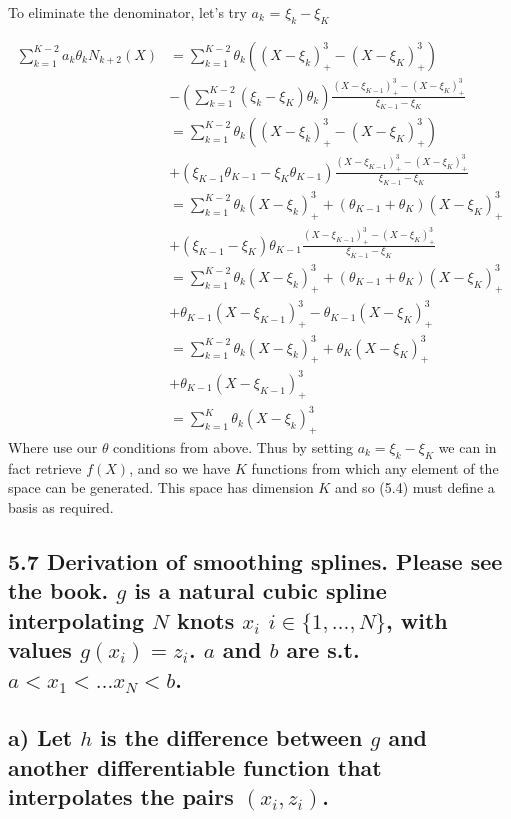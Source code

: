 To eliminate the denominator, let's try $a_k$ = $\xi_k - \xi_K$

\begin{align*}
    \sum_{k=1}^{K-2}a_k \theta_k N_{k+2}(X)  &=  \sum_{k=1}^{K-2 }\theta_k \left( (X - \xi_k)^3_+ - (X - \xi_K)^3_+ \right) \\ 
    &- \left(\sum_{k=1}^{K-2 }(\xi_k - \xi_K) \theta_k \right) \frac{(X - \xi_{K-1})^3_+ - (X  - \xi_K)^3_+}{\xi_{K-1} - \xi_K} \\
    &=  \sum_{k=1}^{K-2 }\theta_k \left( (X - \xi_k)^3_+ - (X - \xi_K)^3_+ \right)\\
    &+ (\xi_{K-1}\theta_{K-1} - \xi_{K}\theta_{K-1})  \frac{(X - \xi_{K-1})^3_+ - (X  - \xi_K)^3_+}{\xi_{K-1} - \xi_K}\\
    &=  \sum_{k=1}^{K-2 }\theta_k (X - \xi_k)^3_+  + (\theta_{K-1} + \theta_K) (X - \xi_K)^3_+\\
    &+ (\xi_{K-1}- \xi_{K})\theta_{K-1} \frac{(X - \xi_{K-1})^3_+ - (X  - \xi_K)^3_+}{\xi_{K-1} - \xi_K}\\
    &=  \sum_{k=1}^{K-2 }\theta_k (X - \xi_k)^3_+  + (\theta_{K-1} + \theta_K) (X - \xi_K)^3_+\\
    &+ \theta_{K-1} (X - \xi_{K-1})^3_+ - \theta_{K-1}(X  - \xi_K)^3_+\\
    &=  \sum_{k=1}^{K-2 }\theta_k (X - \xi_k)^3_+  + \theta_K (X - \xi_K)^3_+\\
    &+ \theta_{K-1} (X - \xi_{K-1})^3_+\\
    &=  \sum_{k=1}^{K }\theta_k (X - \xi_k)^3_+
\end{align*}
Where use our $\theta$ conditions from above.
Thus by setting $a_k = \xi_k - \xi_K$ we can in fact retrieve $f(X)$, and so we have $K$ functions from which any element of the space can be generated. This space has dimension $K$ and so (5.4) must define a basis as required.

\subsection*{5.7 Derivation of smoothing splines. Please see the book. $g$ is a natural cubic spline interpolating $N$ knots $x_i$ $i \in \{1,\dots,N\}$, with values $g(x_i) = z_i$.
$a$ and $b$ are s.t. $a < x_1 < \dots x_N < b$.}
\subsection*{a) Let $h$ is the difference between $g$ and another differentiable function that interpolates the pairs $(x_i, z_i)$.}

